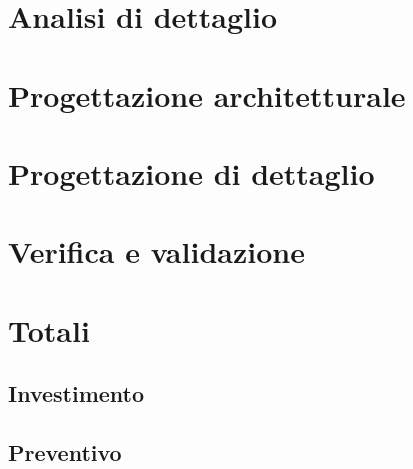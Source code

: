 \documentclass[a4paper]{report}
\begin{document}
		\section{Analisi di dettaglio}
		\section{Progettazione architetturale}
		\section{Progettazione di dettaglio}
		\section{Verifica e validazione}
		\section{Totali}
			\subsection{Investimento}
			\subsection{Preventivo}
\end{document}
